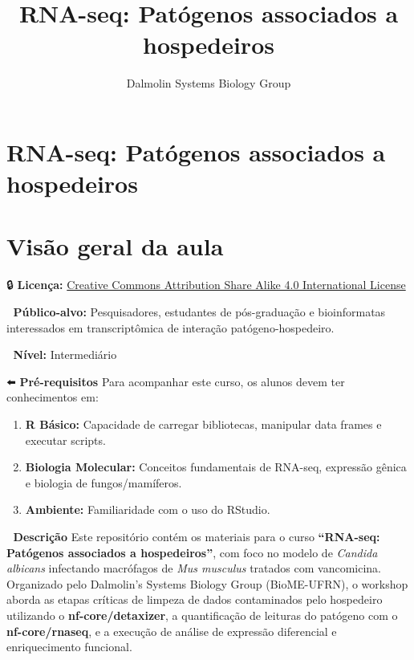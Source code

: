 \documentclass[
  letterpaper,
  DIV=11,
  numbers=noendperiod]{scrreprt}
\title{RNA-seq: Patógenos associados a hospedeiros}
\author{Dalmolin Systems Biology Group}
\date{}
\providecommand{\tightlist}{%
  \setlength{\itemsep}{0pt}\setlength{\parskip}{0pt}}
\renewcommand*\contentsname{Table of contents}
\newcommand\contentsname{Table of contents}
\begin{document}
\maketitle


\renewcommand*\contentsname{Table of contents}
{
\hypersetup{linkcolor=}
\setcounter{tocdepth}{2}
\tableofcontents
}


\chapter{RNA-seq: Patógenos associados a
hospedeiros}\label{rna-seq-patuxf3genos-associados-a-hospedeiros}


\chapter{Visão geral da aula}\label{visuxe3o-geral-da-aula}

🔒 \textbf{Licença:}
\href{https://creativecommons.org/licenses/by-sa/4.0/deed.en}{Creative
Commons Attribution Share Alike 4.0 International License}

👥 \textbf{Público-alvo:} Pesquisadores, estudantes de pós-graduação e
bioinformatas interessados em transcriptômica de interação
patógeno-hospedeiro.

📶 \textbf{Nível:} Intermediário

⬅️ \textbf{Pré-requisitos} Para acompanhar este curso, os alunos devem
ter conhecimentos em:

\begin{enumerate}
\def\labelenumi{\arabic{enumi}.}
\tightlist
\item
  \textbf{R Básico:} Capacidade de carregar bibliotecas, manipular data
  frames e executar scripts.
\item
  \textbf{Biologia Molecular:} Conceitos fundamentais de RNA-seq,
  expressão gênica e biologia de fungos/mamíferos.
\item
  \textbf{Ambiente:} Familiaridade com o uso do RStudio.
\end{enumerate}

📖 \textbf{Descrição} Este repositório contém os materiais para o curso
\textbf{``RNA-seq: Patógenos associados a hospedeiros''}, com foco no
modelo de \emph{Candida albicans} infectando macrófagos de \emph{Mus
musculus} tratados com vancomicina. Organizado pelo Dalmolin's Systems
Biology Group (BioME-UFRN), o workshop aborda as etapas críticas de
limpeza de dados contaminados pelo hospedeiro utilizando o
\textbf{nf-core/detaxizer}, a quantificação de leituras do patógeno com
o \textbf{nf-core/rnaseq}, e a execução de análise de expressão
diferencial e enriquecimento funcional.
\end{document}

